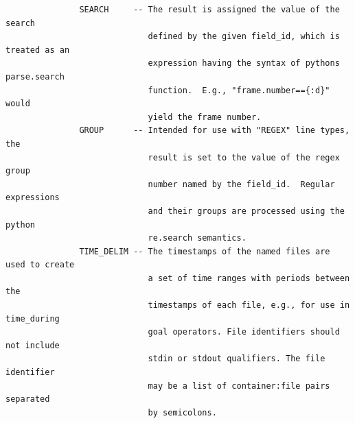 \documentclass[12pt]{article}
\begin{document}
\begin{verbatim}
               SEARCH     -- The result is assigned the value of the search 
                             defined by the given field_id, which is treated as an
                             expression having the syntax of pythons parse.search 
                             function.  E.g., "frame.number=={:d}" would 
                             yield the frame number.
               GROUP      -- Intended for use with "REGEX" line types, the 
                             result is set to the value of the regex group 
                             number named by the field_id.  Regular expressions
                             and their groups are processed using the python
                             re.search semantics.
               TIME_DELIM -- The timestamps of the named files are used to create 
                             a set of time ranges with periods between the 
                             timestamps of each file, e.g., for use in time_during 
                             goal operators. File identifiers should not include
                             stdin or stdout qualifiers. The file identifier
                             may be a list of container:file pairs separated
                             by semicolons.
                              

\end{verbatim}
\end{document}
